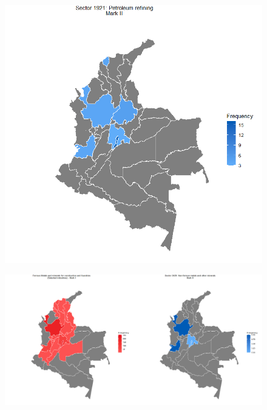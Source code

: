 \documentclass{beamer}
\begin{document}
\begin{frame}[allowframebreaks]
\begin{figure}
		\includegraphics[scale=0.25]{oil.png}
	\end{figure}
	\framebreak
	\begin{figure}
		\centering
		\includegraphics[scale=0.2]{metals.png}
	\end{figure}
	\end{frame}
\end{document}
